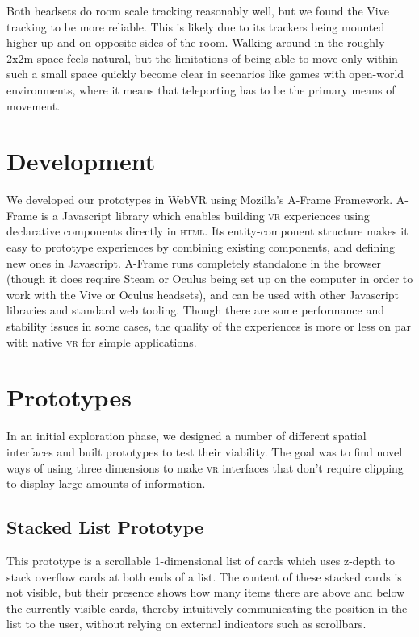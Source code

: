 \documentclass{tufte-book} %
\begin{document}
Both headsets do room scale tracking reasonably well, but we found the Vive tracking to be more reliable. This is likely due to its trackers being mounted higher up and on opposite sides of the room. Walking around in the roughly 2x2m space feels natural, but the limitations of being able to move only within such a small space quickly become clear in scenarios like games with open-world environments, where it means that teleporting has to be the primary means of movement.

\section{Development}
We developed our prototypes in WebVR using Mozilla's A-Frame Framework. A-Frame is a Javascript library which enables building \textsc{vr} experiences using declarative components directly in \textsc{html}. Its entity-component structure makes it easy to prototype experiences by combining existing components, and defining new ones in Javascript. A-Frame runs completely standalone in the browser (though it does require Steam or Oculus being set up on the computer in order to work with the Vive or Oculus headsets), and can be used with other Javascript libraries and standard web tooling. Though there are some performance and stability issues in some cases, the quality of the experiences is more or less on par with native \textsc{vr} for simple applications.

\section{Prototypes}
In an initial exploration phase, we designed a number of different spatial interfaces and built prototypes to test their viability. The goal was to find novel ways of using three dimensions to make \textsc{vr} interfaces that don't require clipping to display large amounts of information.

\subsection{Stacked List Prototype}
This prototype is a scrollable 1-dimensional list of cards which uses z-depth to stack overflow cards at both ends of a list. The content of these stacked cards is not visible, but their presence shows how many items there are above and below the currently visible cards, thereby intuitively communicating the position in the list to the user, without relying on external indicators such as scrollbars.
\end{document}
